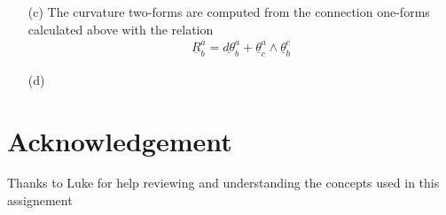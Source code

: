 \documentclass[10pt, a4paper]{article}
\begin{document}
{\begin{enumerate}
\begin{align*}
    &[\cdots] \underline{\omega}^3 = \underline{\theta}^0{ }_{3} = \underline{\theta}^3{ }_{0} = \frac{a'(t)}{a(t)}\underline{\omega}^3 + [\cdots] \underline{\omega}^0 \iff \underline{\theta}^3{ }_{0} = \frac{a'(t)}{a(t)}\underline{\omega}^3, \quad \underline{\theta}^0{ }_{3} = \frac{a'(t)}{a(t)}\underline{\omega}^3\\
    &[\cdots] \underline{\omega}^2 = \underline{\theta}^1{ }_{2} = -\underline{\theta}^2{ }_{1} = -\frac{1}{a(t)r}\cot \theta \underline{\omega}^2 - [\cdots]\underline{\omega}^1 \iff \underline{\theta}^1{ }_{2} = -\frac{1}{a(t)r}\cot \theta \underline{\omega}^2, \quad \underline{\theta}^2{ }_{1} = \frac{1}{a(t)r}\cot \theta \underline{\omega}^2\\
    &[\cdots] \underline{\omega}^2 = \underline{\theta}^3{ }_{2} = -\underline{\theta}^2{ }_{3} = -\frac{1}{a(t)r}\sqrt{1-k r^2}\underline{\omega}^2 - [\cdots]\underline{\omega}^3 \iff \underline{\theta}^3{ }_{2} = -\frac{1}{a(t)r}\sqrt{1-k r^2}\underline{\omega}^2, \quad \underline{\theta}^3{ }_{2} = \frac{1}{a(t)r}\sqrt{1-k r^2}\underline{\omega}^2\\
    &[\cdots] \underline{\omega}^1 = \underline{\theta}^3{ }_{1} = -\underline{\theta}^1{ }_{3} = -\frac{1}{a(t)r}\sqrt{1-k r^2}\underline{\omega}^1 - [\cdots]\underline{\omega}^3 \iff \underline{\theta}^3{ }_{1} = -\frac{1}{a(t)r}\sqrt{1-k r^2}\underline{\omega}^1, \quad \underline{\theta}^1{ }_{3} = \frac{1}{a(t)r}\sqrt{1-k r^2}\underline{\omega}^1
  \end{align*}
  
  \item[(c)] The curvature two-forms are computed from the connection one-forms calculated above with the relation 
  \begin{align*}
    \underline{R}_b^a=\underline{d \theta}_b^a+\underline{\theta}_c^a \wedge \underline{\theta}_b^c
  \end{align*}
  \item[(d)]    
\end{enumerate}

\section{Acknowledgement}

Thanks to Luke for help reviewing and understanding the concepts used in this assignement


}

\makereferences


\end{document}

